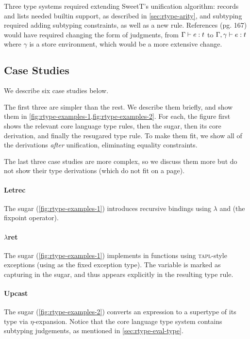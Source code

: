 Three type systems required extending {SweetT}'s unification
algorithm: records and lists needed builtin support, as described in
\cref{sec:rtype-arity}, and subtyping required adding subtyping constraints,
as well as a new  rule.
References (pg. 167) would have required changing the form of
judgments, from $\Gamma \vdash e : t$ to
$\Gamma,\gamma \vdash e : t$ where $\gamma$ is a store environment,
which would be a more extensive change.

\subsection{Case Studies}\label{sec:rtype-eval-case}

We describe six case studies below.

The first three are simpler than the rest. We describe them briefly,
and show them in \cref{fig:rtype-examples-1,fig:rtype-examples-2}. For each, the figure first shows
the relevant core language type rules, then the sugar, then its core
derivation, and finally the resugared type rule. To make them fit, we
show all of the derivations \emph{after} unification, eliminating
equality constraints.

The last three case studies are more complex, so we discuss them more
but do not show their type derivations (which do not fit on a page).


\paragraph{Letrec}
The  sugar (\cref{fig:rtype-examples-1}) introduces
recursive bindings using $\lambda$ and  (the fixpoint
operator).

\paragraph{$\lambda$ret}
The  sugar (\cref{fig:rtype-examples-1}) implements
 in functions using \textsc{tapl}-style exceptions (using
 as the fixed exception type). The variable 
is marked as capturing in the sugar, and thus appears explicitly in
the resulting type rule.

\paragraph{Upcast}
The  sugar (\cref{fig:rtype-examples-2}) converts an expression
to a supertype of its type via $\eta$-expansion. Notice that the core
language type system contains subtyping judgements, as mentioned in
\cref{sec:rtype-eval-type}.


